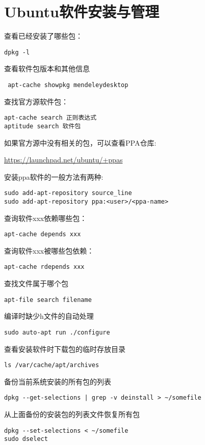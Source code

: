 \section{Ubuntu软件安装与管理}

查看已经安装了哪些包：
\begin{verbatim}
dpkg -l
\end{verbatim}

查看软件包版本和其他信息
\begin{verbatim}
 apt-cache showpkg mendeleydesktop
\end{verbatim}

查找官方源软件包：
\begin{verbatim}
apt-cache search 正则表达式
aptitude search 软件包
\end{verbatim}

如果官方源中没有相关的包，可以查看PPA仓库:

\url{https://launchpad.net/ubuntu/+ppas}

安装ppa软件的一般方法有两种:
\begin{verbatim}
sudo add-apt-repository source_line
sudo add-apt-repository ppa:<user>/<ppa-name>
\end{verbatim}

查询软件xxx依赖哪些包：
\begin{verbatim}
apt-cache depends xxx
\end{verbatim}

查询软件xxx被哪些包依赖：
\begin{verbatim}
apt-cache rdepends xxx
\end{verbatim}

查找文件属于哪个包
\begin{verbatim}
apt-file search filename
\end{verbatim}

编译时缺少h文件的自动处理
\begin{verbatim}
sudo auto-apt run ./configure
\end{verbatim}

查看安装软件时下载包的临时存放目录
\begin{verbatim}
ls /var/cache/apt/archives
\end{verbatim}

备份当前系统安装的所有包的列表
\begin{verbatim}
dpkg --get-selections | grep -v deinstall > ~/somefile
\end{verbatim}

从上面备份的安装包的列表文件恢复所有包
\begin{verbatim}
dpkg --set-selections < ~/somefile
sudo dselect
\end{verbatim}

